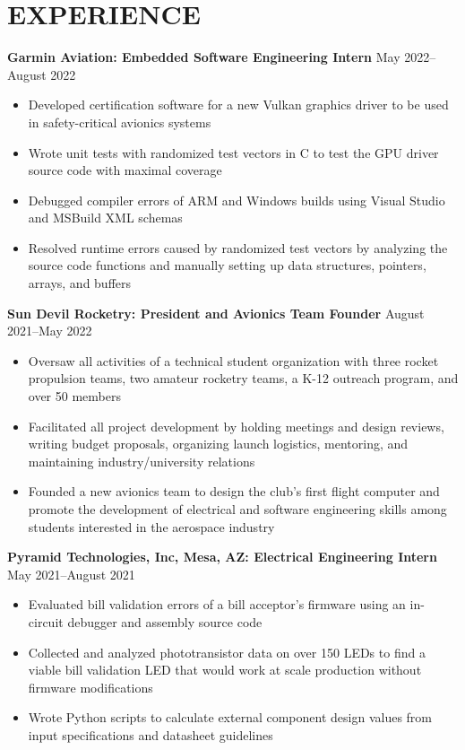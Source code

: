 \documentclass{article}
\begin{document}
\section{EXPERIENCE}
\textbf{Garmin Aviation: Embedded Software Engineering Intern}
\hfill
\vspace{0.5em}
May 2022--August 2022
\begin{itemize}
\item{Developed certification software for a new Vulkan graphics driver to be used in safety-critical avionics systems}
\item{Wrote unit tests with randomized test vectors in C to test the GPU driver source code with maximal coverage}
\item{Debugged compiler errors of ARM and Windows builds using Visual Studio and MSBuild XML schemas}
\item{Resolved runtime errors caused by randomized test vectors by analyzing the source code functions and manually setting up data structures, pointers, arrays, and buffers}
\end{itemize}
\vspace{1em}
\textbf{Sun Devil Rocketry: President and Avionics Team Founder}
\hfill
\vspace{0.5em}
August 2021--May 2022
\begin{itemize}
\item{Oversaw all activities of a technical student organization with three rocket propulsion teams, two amateur rocketry teams, a K-12 outreach program, and over 50 members   }
\item{Facilitated all project development by holding meetings and design reviews, writing budget proposals, organizing launch logistics, mentoring, and maintaining industry/university relations}
\item{Founded a new avionics team to design the club's first flight computer and promote the development of electrical and software engineering skills among students interested in the aerospace industry}
\vspace{1em}
\end{itemize}
\textbf{Pyramid Technologies, Inc, Mesa, AZ: Electrical Engineering Intern}
\hfill 
\vspace{0.5em}
May 2021--August 2021
\begin{itemize}
\item{Evaluated bill validation errors of a bill acceptor's firmware using an in-circuit debugger and assembly source code}
\item{Collected and analyzed phototransistor data on over 150 LEDs to find a viable bill validation
	LED that would work at scale production without firmware modifications}
\item{Wrote Python scripts to calculate external component design values from input specifications and datasheet guidelines}
\end{itemize}
\end{document}

